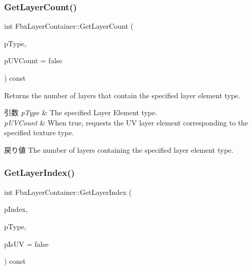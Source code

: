 \subsubsection{\texorpdfstring{Get\+Layer\+Count()}{GetLayerCount()}\hspace{0.1cm}{\footnotesize\ttfamily [2/2]}}
{\footnotesize\ttfamily int Fbx\+Layer\+Container\+::\+Get\+Layer\+Count (\begin{DoxyParamCaption}\item[{\hyperlink{class_fbx_layer_element_a8c95c5cd880b56c776acd379bd86f42c}{Fbx\+Layer\+Element\+::\+E\+Type}}]{p\+Type,  }\item[{bool}]{p\+U\+V\+Count = {\ttfamily false} }\end{DoxyParamCaption}) const}

Returns the number of layers that contain the specified layer element type. 
\begin{DoxyParams}{引数}
{\em p\+Type} & The specified Layer Element type. \\
\hline
{\em p\+U\+V\+Count} & When {\ttfamily true}, requests the UV layer element corresponding to the specified texture type. \\
\hline
\end{DoxyParams}
\begin{DoxyReturn}{戻り値}
The number of layers containing the specified layer element type. 
\end{DoxyReturn}
\mbox{\label{class_fbx_layer_container_aca34de2197e7fde76155d1e5dd5c6e77}} 
\subsubsection{\texorpdfstring{Get\+Layer\+Index()}{GetLayerIndex()}}
{\footnotesize\ttfamily int Fbx\+Layer\+Container\+::\+Get\+Layer\+Index (\begin{DoxyParamCaption}\item[{int}]{p\+Index,  }\item[{\hyperlink{class_fbx_layer_element_a8c95c5cd880b56c776acd379bd86f42c}{Fbx\+Layer\+Element\+::\+E\+Type}}]{p\+Type,  }\item[{bool}]{p\+Is\+UV = {\ttfamily false} }\end{DoxyParamCaption}) const}

